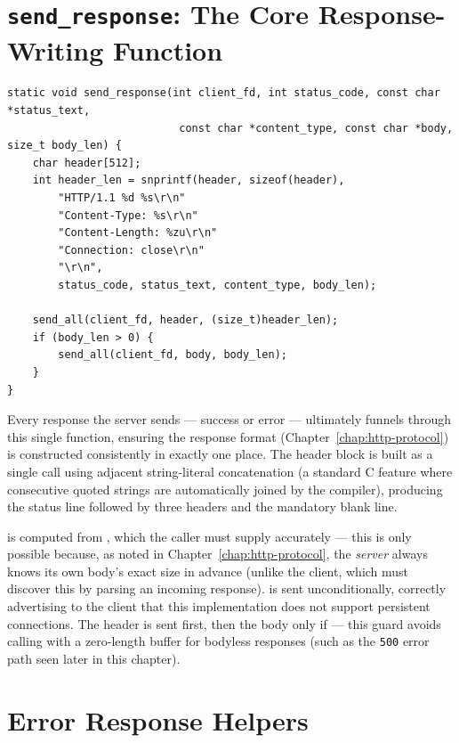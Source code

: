 \section{\texttt{send\_response}: The Core Response-Writing Function}

\begin{lstlisting}[style=cstyle]
static void send_response(int client_fd, int status_code, const char *status_text,
                           const char *content_type, const char *body, size_t body_len) {
    char header[512];
    int header_len = snprintf(header, sizeof(header),
        "HTTP/1.1 %d %s\r\n"
        "Content-Type: %s\r\n"
        "Content-Length: %zu\r\n"
        "Connection: close\r\n"
        "\r\n",
        status_code, status_text, content_type, body_len);

    send_all(client_fd, header, (size_t)header_len);
    if (body_len > 0) {
        send_all(client_fd, body, body_len);
    }
}
\end{lstlisting}

Every response the server sends --- success or error --- ultimately funnels through this single function, ensuring the response format (Chapter~\ref{chap:http-protocol}) is constructed consistently in exactly one place. The header block is built as a single  call using adjacent string-literal concatenation (a standard C feature where consecutive quoted strings are automatically joined by the compiler), producing the status line followed by three headers and the mandatory blank line.

 is computed from , which the caller must supply accurately --- this is only possible because, as noted in Chapter~\ref{chap:http-protocol}, the \emph{server} always knows its own body's exact size in advance (unlike the client, which must discover this by parsing an incoming response).  is sent unconditionally, correctly advertising to the client that this implementation does not support persistent connections. The header is sent first, then the body only if  --- this guard avoids calling  with a zero-length buffer for bodyless responses (such as the \texttt{500} error path seen later in this chapter).

\section{Error Response Helpers}

